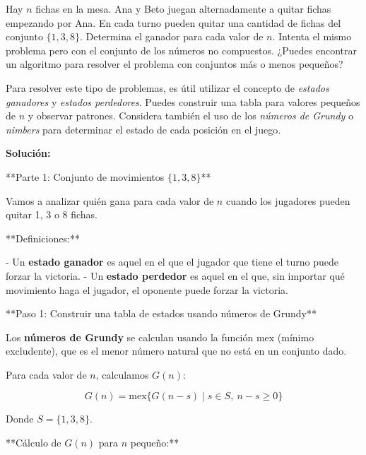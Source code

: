 \documentclass[11pt]{scrartcl}
\begin{document}
\begin{problem}
Hay $n$ fichas en la mesa. Ana y Beto juegan alternadamente a quitar fichas empezando por Ana. En cada turno pueden quitar una cantidad de fichas del conjunto $\{ 1, 3, 8 \}$. Determina el ganador para cada valor de $n$. Intenta el mismo problema pero con el conjunto de los números no compuestos. ¿Puedes encontrar un algoritmo para resolver el problema con conjuntos más o menos pequeños?

\begin{hint}
Para resolver este tipo de problemas, es útil utilizar el concepto de \textit{estados ganadores} y \textit{estados perdedores}. Puedes construir una tabla para valores pequeños de $n$ y observar patrones. Considera también el uso de los \textit{números de Grundy} o \textit{nimbers} para determinar el estado de cada posición en el juego.

\begin{solu}
\textbf{Solución:}

**Parte 1: Conjunto de movimientos $\{1, 3, 8\}$**

Vamos a analizar quién gana para cada valor de $n$ cuando los jugadores pueden quitar 1, 3 o 8 fichas.

**Definiciones:**

- Un \textbf{estado ganador} es aquel en el que el jugador que tiene el turno puede forzar la victoria.
- Un \textbf{estado perdedor} es aquel en el que, sin importar qué movimiento haga el jugador, el oponente puede forzar la victoria.

**Paso 1: Construir una tabla de estados usando números de Grundy**

Los \textbf{números de Grundy} se calculan usando la función $\text{mex}$ (mínimo excludente), que es el menor número natural que no está en un conjunto dado.

Para cada valor de $n$, calculamos $G(n)$:

$$
G(n) = \text{mex}\{ G(n - s) \mid s \in S, \ n - s \geq 0 \}
$$

Donde $S = \{1, 3, 8\}$.

**Cálculo de $G(n)$ para $n$ pequeño:**


\end{solu}
\end{hint}
\end{problem}
\end{document}
